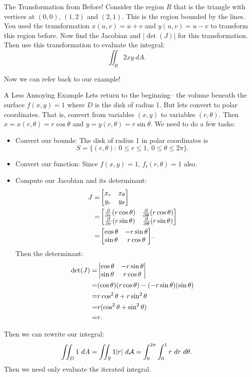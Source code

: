 \begin{exercise}{The Transformation from Before!}
Consider the region $R$ that is the triangle with vertices at $(0,0)$, $(1,2)$ and $(2,1)$. This is the region bounded by the lines. You used the transformation $x(u,v)=u+v$ and $y(u,v)=u-v$ to transform this region before. Now find the Jacobian and $|\det(J)|$ for this transformation. Then use this transformation to evaluate the integral: $$\iint_R 2xy \ dA.$$ 
\end{exercise}

Now we can refer back to our example!

\begin{example}{A Less Annoying Example}
Lets return to the beginning-- the volume beneath the surface $f(x,y)=1$ where $D$ is the disk of radius 1. But lets convert to polar coordinates. That is, convert from variables $(x,y)$ to variables $(r,\theta)$. Then $x=x(r,\theta)=r\cos\theta$ and $y=y(r,\theta)=r\sin\theta$. We need to do a few tasks:
\vspace{1em}
\begin{itemize}
\item Convert our bounds: The disk of radius 1 in polar coordinates is $$S=\big\{(r,\theta):\ 0\leq r\leq 1,\ 0\leq\theta\leq 2\pi \big\}.$$
\vspace{1em}
\item Convert our function: Since $f(x,y)=1$, $f_t(r,\theta)=1$ also.
\vspace{1em}
\item Compute our Jacobian and its determinant: 
\begin{align*}J=&\begin{bmatrix}x_r & x_\theta\\y_r&y_\theta\end{bmatrix} \\
=&\begin{bmatrix}\frac{\partial}{\partial r}(r\cos\theta)& \frac{\partial}{\partial \theta}(r\cos\theta)\\ \frac{\partial}{\partial r}(r\sin\theta)& \frac{\partial}{\partial \theta}(r\sin\theta)\end{bmatrix}\\
=&\begin{bmatrix}\cos\theta & -r\sin\theta\\ \sin\theta & r\cos\theta\end{bmatrix}.
\end{align*}
Then the determinant:
\begin{align*}
\det(J)=&\begin{vmatrix}\cos\theta & -r\sin\theta\\ \sin\theta & r\cos\theta\end{vmatrix}\\
=& (\cos\theta)(r\cos\theta)-(-r\sin\theta)(\sin\theta)\\
=& r\cos^2\theta+r\sin^2\theta\\
=&r(\cos^2\theta+\sin^2\theta)\\
=&r.
\end{align*}
\end{itemize}
Then we can rewrite our integral:
$$\iint_D 1 \ dA=\iint_S 1 |r| \ d\ca{A}=\int_{0}^{2\pi}\int_{0}^1 r \ dr \ d\theta.$$
Then we need only evaluate the iterated integral.


\end{example}
